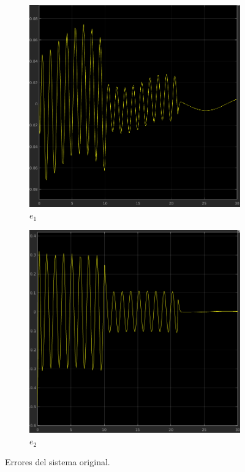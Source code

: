 \documentclass[12pt, letterpaper]{article}
\begin{document}
\begin{figure}[H]
	\centering
	\begin{subfigure}[b]{0.49\linewidth}
		\includegraphics[width=\linewidth]{e1old.png}
		\caption{$e_1$}
	\end{subfigure}
	\begin{subfigure}[b]{0.49\linewidth}
		\includegraphics[width=\linewidth]{e2old.png}
		\caption{$e_2$}
	\end{subfigure}
	\caption{Errores del sistema original.}
\end{figure}
\end{document}
